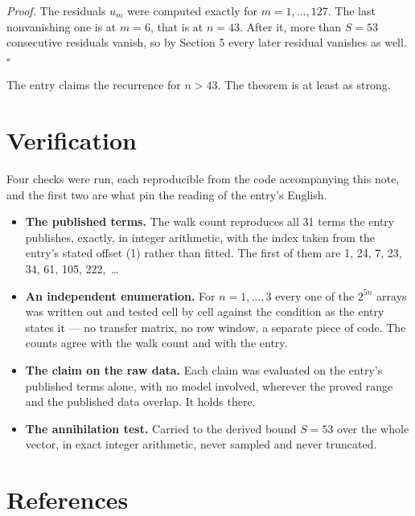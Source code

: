 \documentclass[11pt]{article}
\theoremstyle{definition}
\begin{document}
{\itshape Proof.} The residuals $u_m$ were computed exactly for $m = 1,\dots,127$. The last nonvanishing one is at $m = 6$, that is at $n = 43$. After it, more than $S = 53$ consecutive residuals vanish, so by Section 5 every later residual vanishes as well. $\square$

The entry claims the recurrence for $n > 43$. The theorem is at least as strong.

\section{Verification}

Four checks were run, each reproducible from the code accompanying this note, and the first two are what pin the reading of the entry's English.

\begin{itemize}

\item {\bfseries The published terms.} The walk count reproduces all 31 terms the entry publishes, exactly, in integer arithmetic, with the index taken from the entry's stated offset (1) rather than fitted. The first of them are 1, 24, 7, 23, 34, 61, 105, 222,~\dots

\item {\bfseries An independent enumeration.} For $n = 1,\dots,3$ every one of the $2^{5n}$ arrays was written out and tested cell by cell against the condition as the entry states it --- no transfer matrix, no row window, a separate piece of code. The counts agree with the walk count and with the entry.

\item {\bfseries The claim on the raw data.} Each claim was evaluated on the entry's published terms alone, with no model involved, wherever the proved range and the published data overlap. It holds there.

\item {\bfseries The annihilation test.} Carried to the derived bound $S = 53$ over the whole vector, in exact integer arithmetic, never sampled and never truncated.

\end{itemize}

\section{References}
\end{document}
